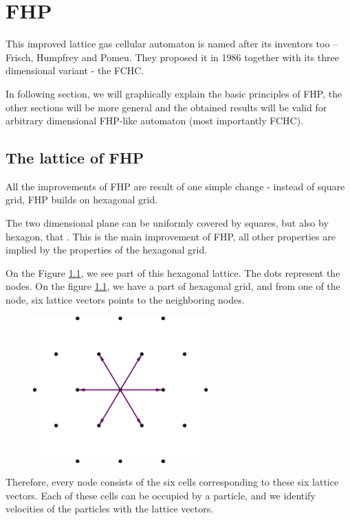 \chapter{FHP}
This improved lattice gas cellular automaton is named after its inventors too -- Frisch, Humpfrey and Pomeu. 
They proposed it in 1986 together with its three dimensional variant - the FCHC. 

In following section, we will graphically explain the basic principles of FHP, the other sections will be more general and the obtained results will be valid for arbitrary dimensional FHP-like automaton (most importantly FCHC).

\section{The lattice of FHP}
All the improvements of FHP are result of one simple change - instead of square grid, FHP builds on hexagonal grid. 

The two dimensional plane can be uniformly covered by squares, but also by hexagon, that . This is the main improvement of FHP, all other properties are implied by the properties of the hexagonal grid.

On the Figure \ref{FHPgrid}, we see part of this hexagonal lattice. The dots represent the nodes.
On the figure \ref{FHPgrid}, we have a part of hexagonal grid, and from one of the node, six lattice vectors points to the neighboring nodes.
\begin{figure}[htbp] \label{FHPgrid}
 \centering
 \includegraphics[width=0.6\textwidth]{./img/fhp_desc}
\end{figure}

Therefore, every node consists of the six cells corresponding to these six lattice vectors. Each of these cells can be occupied by a particle, and we identify velocities of the particles with the lattice vectors.

